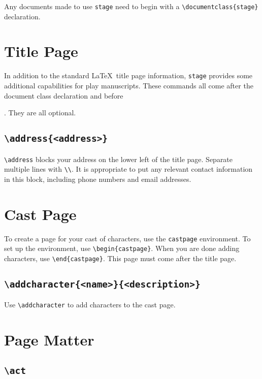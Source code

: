 \documentclass{report}
\begin{document}
Any documents made to use \texttt{stage} need to begin with a \verb|\documentclass{stage}| declaration.

\section{Title Page}

In addition to the standard \LaTeX\ title page information, \texttt{stage} provides some additional capabilities for play manuscripts. These commands all come after the document class declaration and before \maketitle. They are all optional.

\cprotect\subsection{\verb|\address{<address>}|}
\verb|\address| blocks your address on the lower left of the title page. Separate multiple lines with \verb|\\|. It is appropriate to put any relevant contact information in this block, including phone numbers and email addresses.

\section{Cast Page}

To create a page for your cast of characters, use the \texttt{castpage} environment. To set up the environment, use \verb|\begin{castpage}|. When you are done adding characters, use \verb|\end{castpage}|. This page must come after the title page.

\cprotect\subsection{\verb|\addcharacter{<name>}{<description>}|}
Use \verb|\addcharacter| to add characters to the cast page.

\section{Page Matter}

\cprotect\subsection{\verb|\act|}
\end{document}
